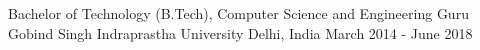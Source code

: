 
\begin{cventries}

  \cventry
    {Bachelor of Technology (B.Tech), Computer Science and Engineering} %
    {Guru Gobind Singh Indraprastha University} %
    {Delhi, India} %
    {March 2014 - June 2018} %

\end{cventries}
